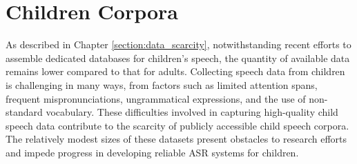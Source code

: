 \section{Children Corpora}
\label{section:children_corpora}
As described in Chapter \ref{section:data_scarcity}, notwithstanding recent efforts to assemble dedicated databases for children's speech, the quantity of available data remains lower compared to that for adults. Collecting speech data from children  is challenging in many ways, from factors such as limited attention spans, frequent mispronunciations, ungrammatical expressions, and the use of non-standard vocabulary. These difficulties involved in capturing high-quality child speech data contribute to the scarcity of publicly accessible child speech corpora. The relatively modest sizes of these datasets present obstacles to research efforts and impede progress in developing reliable \ac{ASR} systems for children.


